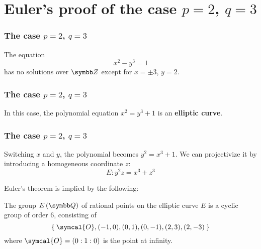 \section{Euler's proof of the case \texorpdfstring{\(p = 2\), \(q = 3\)}{p = 2, q = 3}}

\begin{frame}
\frametitle{The case \texorpdfstring{\(p = 2\), \(q = 3\)}{p = 2, q = 3}}

\begin{theorem}[Euler, 1738]
The equation
\[
    x^2 - y^3 = 1
\]
has no solutions over \(\integers\) except for \(x = \pm 3\), \(y = 2\).
\end{theorem}

\vspace{1em}
\end{frame}

\begin{frame}
\frametitle{The case \texorpdfstring{\(p = 2\), \(q = 3\)}{p = 2, q = 3}}

In this case, the polynomial equation \(x^2 = y^3 + 1\) is an \textbf{elliptic curve}.

\begin{figure}
    \centering
\end{figure}
\end{frame}

\begin{frame}
\frametitle{The case \texorpdfstring{\(p = 2\), \(q = 3\)}{p = 2, q = 3}}

Switching \(x\) and \(y\), the polynomial becomes \(y^2 = x^3 + 1\). We can projectivize it by introducing a homogeneous coordinate \(z\):
\[
    E : y^2 z = x^3 + z^3
\]

\pause

Euler's theorem is implied by the following:
\begin{theorem}
The group \(E\left(\rationals\right)\) of rational points on the elliptic curve \(E\) is a cyclic group of order \(6\), consisting of
\[
    \Set{ \symcal{O}, (-1, 0), (0, 1), (0, -1), (2, 3), (2, -3) }
\]
where \(\symcal{O} = (0 : 1 : 0)\) is the point at infinity.
\end{theorem}
\end{frame}


